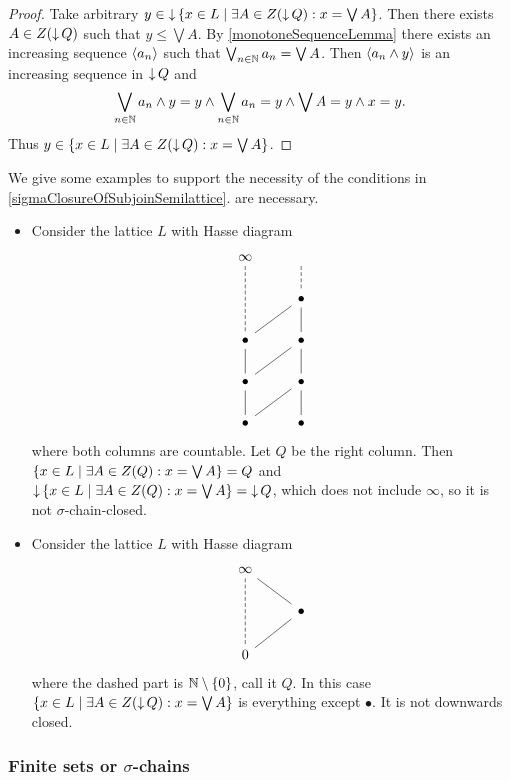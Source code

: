 \begin{proof}
Take arbitrary $y\in \downset \setbuilder{x\in L}{\exists A\in Z(\downset Q): x = \bigvee A}$. Then there exists $A\in Z(\operatorname{\downarrow} Q)$ such that $y \leq \bigvee A$. By \ref{monotoneSequenceLemma} there exists an increasing sequence $\left\langle a_n \right\rangle$ such that $\bigvee_{n\in \mathbb{N}} a_n = \bigvee A$. Then $\left\langle a_n \wedge y \right\rangle$ is an increasing sequence in $\operatorname{\downarrow} Q$ and
\[ \bigvee_{n\in \mathbb{N}}a_n \wedge y = y \wedge \bigvee_{n\in \mathbb{N}}a_n = y \wedge \bigvee A = y \wedge x = y. \]
Thus $y\in \setbuilder{x\in L}{\exists A\in Z(\downset Q): x = \bigvee A}$.
\end{proof}

\begin{example}
We give some examples to support the necessity of the conditions in \ref{sigmaClosureOfSubjoinSemilattice}. are necessary.

\begin{itemize}
\item Consider the lattice $L$ with Hasse diagram
\[ \begin{tikzcd}
\infty \ar[dd, dashed, dash] & {} \ar[d, dashed, dash] \\
{} & \bullet \ar[dl, dash] \ar[d, dash] \\
\bullet \ar[d, dash] & \bullet \ar[dl, dash] \ar[d, dash] \\
\bullet \ar[d, dash] & \bullet \ar[dl, dash] \ar[d, dash] \\
\bullet & \bullet
\end{tikzcd} \]
where both columns are countable. Let $Q$ be the right column. Then $\setbuilder{x\in L}{\exists A\in Z(Q): x = \bigvee A} = Q$ and $\downset \setbuilder{x\in L}{\exists A\in Z(Q): x = \bigvee A} = \downset Q$, which does not include $\infty$, so it is not $\sigma$-chain-closed. 

\item Consider the lattice $L$ with Hasse diagram
\[ \begin{tikzcd}
\infty \ar[dd, dashed, dash] \ar[dr, dash] & {} \\
{} & \bullet \ar[dl, dash] \\
0 & {}
\end{tikzcd} \]
where the dashed part is $\mathbb{N} \setminus\{0\}$, call it $Q$. In this case $\setbuilder{x\in L}{\exists A\in Z(\downset Q): x = \bigvee A}$ is everything except $\bullet$. It is not downwards closed.
\end{itemize}
\end{example}

\subsubsection{Finite sets or $\sigma$-chains}

